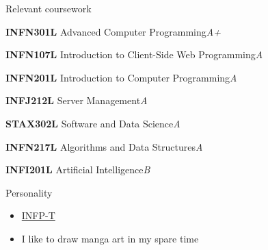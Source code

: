 \documentclass{resume} %
\begin{document}

\begin{rSection}{Relevant coursework}
\vspace{-1.25em}
\item \textbf{INFN301L} {Advanced Computer Programming}\hfill \textit{A+}
\item \textbf{INFN107L} {Introduction to Client-Side Web Programming}\hfill \textit{A}
\item \textbf{INFN201L} {Introduction to Computer Programming}\hfill \textit{A}
\item \textbf{INFJ212L} {Server Management}\hfill \textit{A}
\item \textbf{STAX302L} {Software and Data Science}\hfill \textit{A}
\item \textbf{INFN217L} {Algorithms and Data Structures}\hfill \textit{A}
\item \textbf{INFI201L} {Artificial Intelligence}\hfill \textit{B}
\end{rSection} 




\begin{rSection}{Personality} 
\begin{itemize}
    \item \href{https://www.16personalities.com/infp-personality}{INFP-T}\item{I like to draw manga art in my spare time}
\end{itemize}


\end{rSection}
\end{document}
